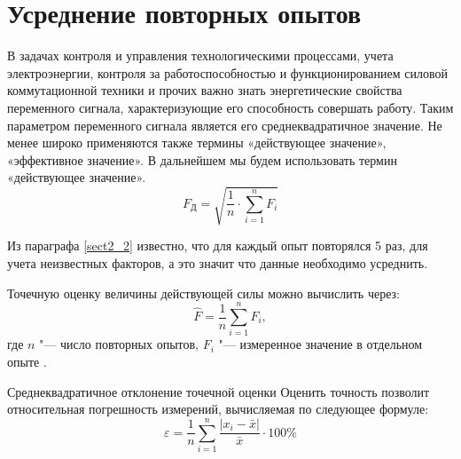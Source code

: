 \section{Усреднение повторных опытов}\label{sect3_2}


В задачах контроля и управления технологическими процессами, учета электроэнергии, контроля за работоспособностью и функционированием силовой коммутационной техники и прочих важно знать энергетические свойства переменного сигнала, характеризующие  его способность совершать работу. Таким параметром переменного сигнала является  его среднеквадратичное значение. Не менее широко применяются также термины «действующее значение», «эффективное значение». В дальнейшем мы будем использовать термин «действующее значение».
\begin{equation}\label{eq:rms}
F_\text{Д}=\sqrt{\frac{1}{n}\cdot\sum_{i=1}^{n} F_i}
\end{equation}


Из параграфа \ref{sect2_2} известно, что для каждый опыт повторялся 5 раз, для учета неизвестных факторов, а это значит что данные необходимо усреднить.

Точечную оценку величины действующей силы можно вычислить через:
\begin{equation}\label{eq:x_ocenka}
\hat{F}=\frac{1}{n}\sum_{i=1}^{n} F_i,
\end{equation}
где $ n $ "--- число повторных опытов, $ F_i $ "--- измеренное значение в отдельном опыте \cite{Zajigaev}.

Среднеквадратичное отклонение точечной оценки 
Оценить точность позволит относительная погрешность измерений, вычисляемая по следующее формуле:
\begin{equation}\label{eq:Error}
\varepsilon=\frac{1}{n}\sum_{i=1}^{n} \frac{\left| x_i-\bar{x}\right| }{\bar{x}}\cdot100\%
\end{equation}